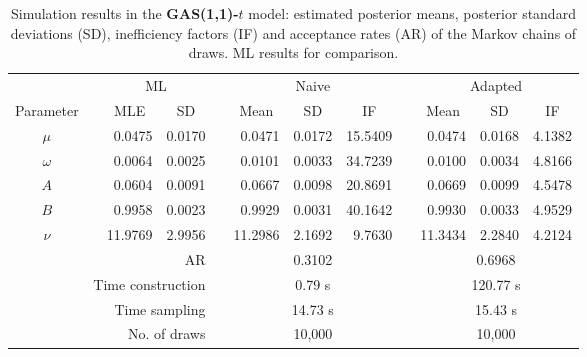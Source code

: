 { \renewcommand{\arraystretch}{1.3} 
\begin{table}[h] 
\centering 
\caption{Simulation results in the \textbf{GAS(1,1)-$t$} model: estimated posterior means, posterior standard deviations (SD), inefficiency factors (IF) and acceptance rates (AR) of the Markov chains of draws. ML results for comparison.} 
\label{tab:posterior_t_gas} 
\begin{tabular}{cc rr c rrr c rrr}  
 & & \multicolumn{2}{c}{ML} & & \multicolumn{3}{c}{Naive} & & \multicolumn{3}{c}{Adapted} \\  \cline{3-4} \cline{6-8} \cline{10-12} 
 Parameter & &  \multicolumn{1}{c}{MLE} &  \multicolumn{1}{c}{SD}  & &  \multicolumn{1}{c}{Mean} &  \multicolumn{1}{c}{SD} &  \multicolumn{1}{c}{IF} & &  \multicolumn{1}{c}{Mean} &  \multicolumn{1}{c}{SD} &  \multicolumn{1}{c}{IF} \\ \cline{1-1}  \cline{3-4} \cline{6-8} \cline{10-12}  
$\mu$ & & 0.0475 &  0.0170 & & 0.0471 &  0.0172 & 15.5409 & & 0.0474 &  0.0168 &  4.1382 \\ [1ex] 
$\omega$ & & 0.0064 &  0.0025 & & 0.0101 &  0.0033 & 34.7239 & & 0.0100 &  0.0034 &  4.8166 \\ [1ex] 
$A$ & & 0.0604 &  0.0091 & & 0.0667 &  0.0098 & 20.8691 & & 0.0669 &  0.0099 &  4.5478 \\ [1ex] 
$B$ & & 0.9958 &  0.0023 & & 0.9929 &  0.0031 & 40.1642 & & 0.9930 &  0.0033 &  4.9529 \\ [1ex] 
$\nu$ & &11.9769 &  2.9956 & &11.2986 &  2.1692 &  9.7630 & &11.3434 &  2.2840 &  4.2124 \\ [1ex] 
\cline{1-1}  \cline{3-4} \cline{6-8} \cline{10-12}   
\multicolumn{4}{r}{AR} & &\multicolumn{3}{c}{0.3102} &&\multicolumn{3}{c}{0.6968} \\ 
  \cline{1-4} \cline{6-8} \cline{10-12}  
 \multicolumn{4}{r}{Time construction} & &\multicolumn{3}{c}{0.79 s} &&\multicolumn{3}{c}{120.77 s} \\ 
   \multicolumn{4}{r}{Time sampling} & &\multicolumn{3}{c}{14.73 s} &&\multicolumn{3}{c}{15.43 s} \\ 
   \multicolumn{4}{r}{No. of draws }& &\multicolumn{3}{c}{10,000} &&\multicolumn{3}{c}{10,000} \\ 
  \cline{1-4} \cline{6-8} \cline{10-12} 
\hline 
\end{tabular} 
\end{table} 
} 
